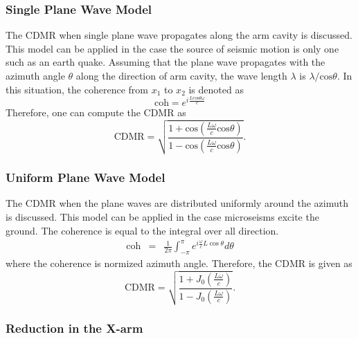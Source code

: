 \documentclass[a4paper,12pt]{book}
\begin{document}
\subsubsection{Single Plane Wave Model}
The CDMR when single plane wave propagates along the arm cavity is discussed. This model can be applied in the case the source of seismic motion is only one such as an earth quake. Assuming that the plane wave propagates with the azimuth angle $\theta$ along the direction of arm cavity, the wave length $\lambda$ is $\lambda/\mathrm{cos}\theta$. In this situation, the coherence from $x_1$ to $x_2$ is denoted as
\begin{equation}
  \mathrm{coh}=e^{i\frac{L\mathrm{cos}\theta\omega}{c}}
\end{equation}
Therefore, one can compute the CDMR as
\begin{equation}  \label{eq:eq18}
  \mathrm{CDMR} = \sqrt{\frac{1+\mathrm{cos}(\frac{L\omega}{c}\mathrm{cos}\theta)}{1-\mathrm{cos}(\frac{L\omega}{c}\mathrm{cos}\theta)}}.
\end{equation}


\subsubsection{Uniform Plane Wave Model}
The CDMR when the plane waves are distributed uniformly around the azimuth is discussed. This model can be applied in the case microseisms excite the ground. The coherence is equal to the integral over all direction.
\begin{eqnarray} \label{eq:eq19}
  \mathrm{coh} &=& \frac{1}{2\pi} \int_{-\pi}^{\pi} e^{i\frac{\omega}{c} L\cos \theta} d \theta
\end{eqnarray}
where the coherence is normized azimuth angle. Therefore, the CDMR is given as
\begin{equation}  \label{eq:eq20}
  \mathrm{CDMR} = \sqrt{\frac{1+J_0(\frac{L\omega}{c})}{1-J_0(\frac{L\omega}{c})}} .
\end{equation}


\subsubsection{Reduction in the X-arm}
\end{document}
